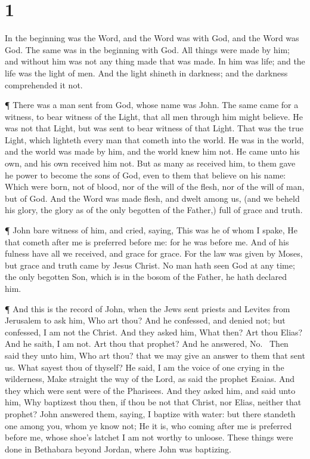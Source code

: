 \hypertarget{section}{%
\section{1}\label{section}}

 In the beginning was the Word, and the Word was with God,
and the Word was God.  The same was in the beginning with
God.  All things were made by him; and without him was not
any thing made that was made.  In him was life; and the life
was the light of men.  And the light shineth in darkness;
and the darkness comprehended it not.

 ¶ There was a man sent from God, whose name was John.
 The same came for a witness, to bear witness of the Light,
that all men through him might believe.  He was not that
Light, but was sent to bear witness of that Light.  That was
the true Light, which lighteth every man that cometh into the world.
 He was in the world, and the world was made by him, and
the world knew him not.  He came unto his own, and his own
received him not.  But as many as received him, to them
gave he power to become the sons of God, even to them that believe on
his name:  Which were born, not of blood, nor of the will
of the flesh, nor of the will of man, but of God.  And the
Word was made flesh, and dwelt among us, (and we beheld his glory, the
glory as of the only begotten of the Father,) full of grace and truth.

 ¶ John bare witness of him, and cried, saying, This was he
of whom I spake, He that cometh after me is preferred before me: for he
was before me.  And of his fulness have all we received,
and grace for grace.  For the law was given by Moses, but
grace and truth came by Jesus Christ.  No man hath seen God
at any time; the only begotten Son, which is in the bosom of the Father,
he hath declared him.

 ¶ And this is the record of John, when the Jews sent
priests and Levites from Jerusalem to ask him, Who art thou?
 And he confessed, and denied not; but confessed, I am not
the Christ.  And they asked him, What then? Art thou Elias?
And he saith, I am not. Art thou that prophet? And he answered,
No.~ Then said they unto him, Who art thou? that we may
give an answer to them that sent us. What sayest thou of thyself?
 He said, I am the voice of one crying in the wilderness,
Make straight the way of the Lord, as said the prophet Esaias.
 And they which were sent were of the Pharisees.
 And they asked him, and said unto him, Why baptizest thou
then, if thou be not that Christ, nor Elias, neither that prophet?
 John answered them, saying, I baptize with water: but
there standeth one among you, whom ye know not;  He it is,
who coming after me is preferred before me, whose shoe's latchet I am
not worthy to unloose.  These things were done in Bethabara
beyond Jordan, where John was baptizing.

